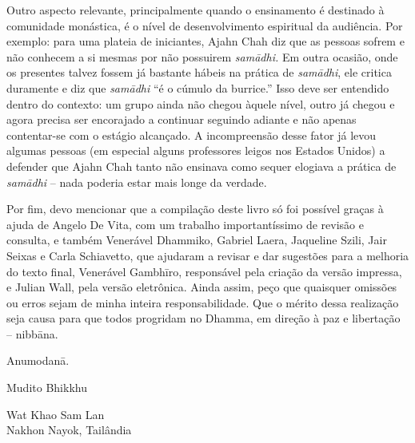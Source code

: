 Outro aspecto relevante, principalmente quando o ensinamento é
destinado à comunidade monástica, é o nível de desenvolvimento
espiritual da audiência. Por exemplo: para uma plateia de iniciantes,
Ajahn Chah diz que as pessoas sofrem e não conhecem a si mesmas por não
possuirem \emph{samādhi.} Em outra ocasião, onde os presentes
talvez fossem já bastante hábeis na prática de \emph{samādhi}, ele
critica duramente e diz que \emph{samādhi} “é o cúmulo da burrice.”
Isso deve ser entendido dentro do contexto: um grupo ainda não chegou
àquele nível, outro já chegou e agora precisa ser encorajado a
continuar seguindo adiante e não apenas contentar-se com o estágio
alcançado. A incompreensão desse fator já levou algumas pessoas (em
especial alguns professores leigos nos Estados Unidos) a defender que
Ajahn Chah tanto não ensinava como sequer elogiava a prática de
\emph{samādhi} – nada poderia estar mais longe da verdade.

Por fim, devo mencionar que a compilação deste livro só foi possível
graças à ajuda de Angelo De Vita, com um trabalho importantíssimo de
revisão e consulta, e também Venerável Dhammiko, Gabriel \mbox{Laera},
Jaqueline Szili, Jair Seixas e Carla Schiavetto, que ajudaram a revisar
e dar sugestões para a melhoria do texto final, Venerável Gambhīro,
responsável pela criação da versão impressa, e Julian Wall, pela versão
eletrônica. Ainda assim, peço que quaisquer omissões ou erros sejam de
minha inteira responsabilidade.  Que o mérito dessa realização seja
causa para que todos progridam no Dhamma, em direção à paz e libertação
– nibbāna.

Anumodanā.
\bigskip

{\raggedleft
Mudito Bhikkhu

Wat Khao Sam Lan\\
Nakhon Nayok, Tailândia
\par}

